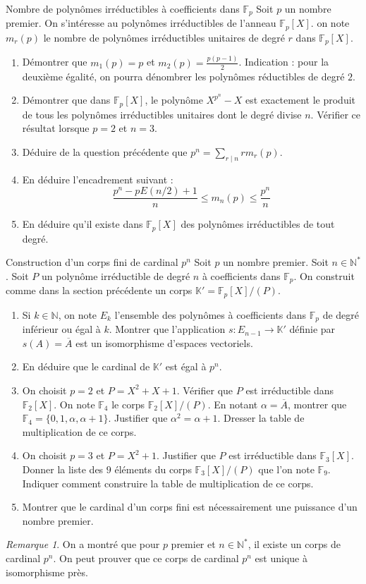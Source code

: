 \documentclass[french,a4paper]{article}
\newcommand{\N}{\mathbb{N}}
\newcommand{\K}{\mathbb{K}}
\newcommand{\st}{^*}
\newcommand{\F}{\mathbb{F}}
\theoremstyle{plain}
\theoremstyle{definition}
\theoremstyle{remark}
\newtheorem*{rmq}{Remarque}
\begin{document}
\begin{ex}{Nombre de polynômes irréductibles à coefficients dans $\F_p$}
	Soit $p$ un nombre premier. On s'intéresse au polynômes irréductibles de l'anneau $\F_p[X]$. on note $m_r(p)$ le nombre de polynômes irréductibles unitaires de degré $r$ dans $\F_p[X]$.
	\begin{enumerate}
		\item Démontrer que $m_1(p)=p$ et $m_2(p)=\displaystyle\frac{p(p-1)}{2}$. Indication : pour la deuxième égalité, on pourra dénombrer les polynômes réductibles de degré $2$.
		\item Démontrer que dans $\F_p[X]$, le polynôme $X^{p^n}-X$ est exactement le produit de tous les polynômes irréductibles unitaires dont le degré divise $n$. Vérifier ce résultat lorsque $p=2$ et $n=3$.
		\item Déduire de la question précédente que $p^n=\displaystyle\sum_{r\mid n}rm_r(p)$.
		\item En déduire l'encadrement suivant : $$\frac{p^n-p{E(n/2)+1}}{n}\leqslant m_n(p)\leqslant\frac{p^n}{n}$$
		\item En déduire qu'il existe dans $\F_p[X]$ des polynômes irréductibles de tout degré.
	\end{enumerate}
\end{ex}
\begin{ex}{Construction d'un corps fini de cardinal $p^n$}
	Soit $p$ un nombre premier. Soit $n\in\N\st$. Soit $P$ un polynôme irréductible de degré $n$ à coefficients dans $\F_p$. On construit comme dans la section précédente un corps $\K'=\F_p[X]/(P)$.
	\begin{enumerate}
		\item Si $k\in\N$, on note $E_k$ l'ensemble des polynômes à coefficients dans $\F_p$ de degré inférieur ou égal à $k$. Montrer que l'application $s:E_{n-1}\to\K'$ définie par $s(A)=\overline{A}$ est un isomorphisme d'espaces vectoriels.
		\item En déduire que le cardinal de $\K'$ est égal à $p^n$.
		\item On choisit $p=2$ et $P=X^2+X+1$. Vérifier que $P$ est irréductible dans $\F_2[X]$. On note $\F_4$ le corps $\F_2[X]/(P)$. En notant $\alpha=\overline{A}$, montrer que $\F_4=\{0,1,\alpha,\alpha+1\}$. Justifier que $\alpha^2=\alpha+1$. Dresser la table de multiplication de ce corps.
		\item On choisit $p=3$ et $P=X^2+1$. Justifier que $P$ est irréductible dans $\F_3[X]$. Donner la liste des $9$ éléments du corps $\F_3[X]/(P)$ que l'on note $\F_9$. Indiquer comment construire la table de multiplication de ce corps.
		\item Montrer que le cardinal d'un corps fini est nécessairement une puissance d'un nombre premier.
	\end{enumerate}
\end{ex}
\begin{rmq}
	On a montré que pour $p$ premier et $n\in\N\st$, il existe un corps de cardinal $p^n$. On peut prouver que ce corps de cardinal $p^n$ est unique à isomorphisme près.
\end{rmq}
\end{document}
